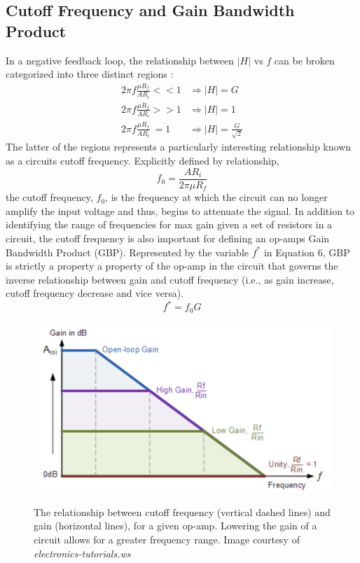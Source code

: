\documentclass[letterpaper,12pt]{article}
\begin{document}
\subsection{Cutoff Frequency and Gain Bandwidth Product}
In a negative feedback loop, the relationship between $|H|$ vs $f$ can be broken categorized into three distinct regions :
\begin{align*}
    2 \pi f \frac{\mu R_f}{A R_i} << 1 &  \Rightarrow |H| = G \\
    2 \pi f \frac{\mu R_f}{A R_i} >> 1 &  \Rightarrow |H| = 1 \\
    2 \pi f \frac{\mu R_f}{A R_i} \ =1 &  \Rightarrow |H| = \frac{G}{\sqrt{2}}
\end{align*}
The latter of the regions represents a particularly interesting relationship known as a circuits cutoff frequency. Explicitly defined by relationship,
\begin{equation}
    \label{cutoff}
    f_0 = \frac{A R_i}{2\pi \mu R_f}
\end{equation}
the cutoff frequency, $f_0$, is the frequency at which the circuit can no longer amplify the input voltage and thus, begins to attenuate the signal. In addition to identifying the range of frequencies for max gain given a set of resistors in a circuit, the cutoff frequency is also important for defining an op-amps Gain Bandwidth Product (GBP). Represented by the variable $f^*$ in Equation 6, GBP is strictly a property a property of the op-amp in the circuit that governs the inverse relationship between gain and cutoff frequency (i.e., as gain increase, cutoff frequency decrease and vice versa).
\begin{equation}
    \label{GBP}
    f^* = f_0G
\end{equation}

\begin{figure}[ht]
    \centering
    \includegraphics[scale = .5]{GBPpic.png}
    \label{GBPpic}
    \caption{\small The relationship between cutoff frequency (vertical dashed lines) and gain (horizontal lines), for a given op-amp. Lowering the gain of a circuit allows for a greater frequency range. Image courtesy of \textit{electronics-tutorials.ws}}
\end{figure}
\end{document}
